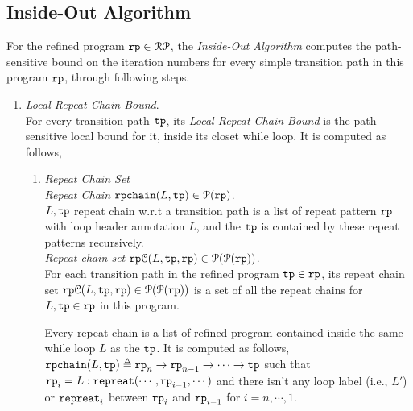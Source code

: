 \subsection{Inside-Out Algorithm}
\label{sec:pathsensitive_rb-inoutalg}
For the refined program $\mathtt{rp} \in \mathcal{RP}$, the \emph{Inside-Out Algorithm}
computes the path-sensitive bound on the iteration numbers for every simple transition path in this program $\mathtt{rp}$,
through following steps.

\begin{enumerate}
  \item \emph{Local Repeat Chain Bound}.
  \\
  For every transition path $\mathtt{tp}$, its \emph{Local Repeat Chain Bound} is the 
  path sensitive local bound for it, inside its closet while loop.
  It is computed as follows,
  \begin{enumerate}
\item \emph{Repeat Chain Set}
\\
\emph{Repeat Chain} $\mathtt{rpchain}(L, \mathtt{tp}) \in \mathcal{P}(\mathtt{rp})$.
\\
$L, \mathtt{tp}$ 
repeat chain w.r.t a transition path
is a list of repeat pattern $\mathtt{rp}$ with loop header annotation $L$,
and the $\mathtt{tp}$ is contained by these repeat patterns recursively.
\\
\emph{Repeat chain set}
$\mathtt{rp}\mathcal{C}(L, \mathtt{tp}, \mathtt{rp}) \in \mathcal{P}(\mathcal{P}(\mathtt{rp}))$.
\\
For each transition path in the refined program $\mathtt{tp} \in \mathtt{rp}$, 
its repeat chain set 
$\mathtt{rp}\mathcal{C}(L, \mathtt{tp}, \mathtt{rp}) \in \mathcal{P}(\mathcal{P}(\mathtt{rp}))$
 is a set of all the repeat chains for $L, \mathtt{tp} \in \mathtt{rp}$ in this program.
 \begin{defn}
  \label{def:repeatchain}
 Every repeat chain is a list of refined program contained inside the same while loop $L$ as the $\mathtt{tp}$. It is computed as follows,
\\
  $\mathtt{rpchain}(L, \mathtt{tp}) \triangleq \mathtt{rp}_n \to \mathtt{rp}_{n-1} \to \cdots \to \mathtt{tp} $
 such that 
 $\mathtt{rp}_{i}= L : \mathtt{repreat}(\cdots, \mathtt{rp}_{i - 1}, \cdots)$ and
 there isn't any loop label (i.e., $L'$) or $\mathtt{repreat}_i$ between $\mathtt{rp}_{i}$ and $\mathtt{rp}_{i - 1}$ for $i = n, \cdots, 1$.

\end{defn}
\end{enumerate}
\end{enumerate}
